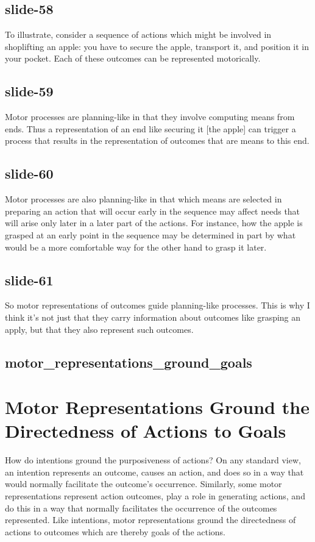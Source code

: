 \documentclass[12pt,\papersize]{extarticle}
\begin{document}
\subsection{slide-58}
To illustrate, consider a sequence of actions which might be involved in shoplifting an apple: you have to secure the apple, transport it, and position it in your pocket.
Each of these outcomes can be represented motorically.

\subsection{slide-59}
Motor processes are planning-like in that they involve computing means from ends.
Thus a representation of an end like securing it [the apple] can trigger a process
that results in the representation of outcomes that are means to this end.

\subsection{slide-60}
Motor processes are also planning-like in that which means are selected in preparing an
action that will occur early in the sequence may affect needs that will arise only later
in a later part of the actions.
For instance, how the apple is grasped at an early point in the sequence may be determined
in part by what would be a more comfortable way for the other hand to grasp it later.

\subsection{slide-61}
So motor representations of outcomes guide planning-like processes.
This is why I think it’s not just that they carry information about outcomes
like grasping an apply, but that they also represent such outcomes.

\subsection{motor\_representations\_ground\_goals}


\section{Motor Representations Ground the Directedness of Actions to Goals}

How do intentions ground the purposiveness of actions? On any standard view, an intention
represents an outcome, causes an action, and does so in a way that would normally facilitate
the outcome’s occurrence. Similarly, some motor representations represent action
outcomes, play a role in generating actions, and do this in a way that normally facilitates
the occurrence of the outcomes represented.  Like intentions, motor representations
ground the directedness of actions to outcomes which are thereby goals of the actions.
\end{document}
